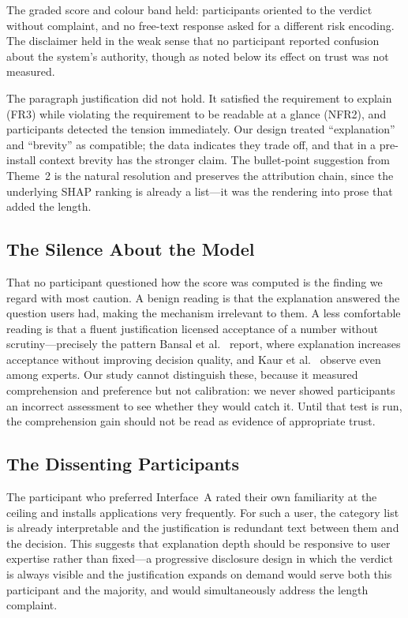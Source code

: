 \documentclass[sigconf]{acmart}
\begin{document}
The graded score and colour band held: participants oriented to the verdict
without complaint, and no free-text response asked for a different risk
encoding. The disclaimer held in the weak sense that no participant
reported confusion about the system's authority, though as noted below its
effect on trust was not measured.

The paragraph justification did not hold. It satisfied the requirement to
explain (FR3) while violating the requirement to be readable at a glance
(NFR2), and participants detected the tension immediately. Our design
treated ``explanation'' and ``brevity'' as compatible; the data indicates
they trade off, and that in a pre-install context brevity has the stronger
claim. The bullet-point suggestion from Theme~2 is the natural resolution
and preserves the attribution chain, since the underlying SHAP ranking is
already a list---it was the rendering into prose that added the length.

\subsection{The Silence About the Model}

That no participant questioned how the score was computed is the finding we
regard with most caution. A benign reading is that the explanation answered
the question users had, making the mechanism irrelevant to them. A less
comfortable reading is that a fluent justification licensed acceptance of a
number without scrutiny---precisely the pattern Bansal et
al.~\cite{bansal2021wholeexceeds} report, where explanation increases
acceptance without improving decision quality, and Kaur et
al.~\cite{kaur2020interpreting} observe even among experts. Our study
cannot distinguish these, because it measured comprehension and preference
but not calibration: we never showed participants an incorrect assessment
to see whether they would catch it. Until that test is run, the
comprehension gain should not be read as evidence of appropriate trust.

\subsection{The Dissenting Participants}

The participant who preferred Interface~A rated their own familiarity at
the ceiling and installs applications very frequently. For such a user, the
category list is already interpretable and the justification is redundant
text between them and the decision. This suggests that explanation depth
should be responsive to user expertise rather than fixed---a progressive
disclosure design in which the verdict is always visible and the
justification expands on demand would serve both this participant and the
majority, and would simultaneously address the length complaint.
\end{document}
